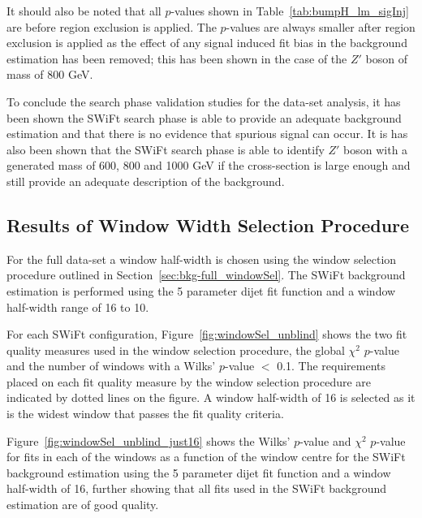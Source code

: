 It should also be noted that all \bh{} $p$-values shown in Table~\ref{tab:bumpH_lm_sigInj} are before region exclusion is applied.
The \bh{} \mbox{$p$-value}s are always smaller after region exclusion is applied
as the effect of any signal induced fit bias in the background estimation has been removed;
this has been shown in the case of the $Z'$ boson of mass of 800 GeV.

To conclude the search phase validation studies for the \lm{} data-set analysis,
it has been shown the SWiFt search phase is
able to provide an adequate background estimation 
and that there is no evidence that spurious signal can occur.
It is has also been shown that 
the SWiFt search phase is able to identify
$Z'$ boson with a generated mass of 600, 800 and 1000 GeV if the cross-section is large enough
and still provide an adequate description of the background.

\subsection{Results of Window Width Selection Procedure}
\label{sec:bkg-full_windowSelResults}

For the full \lm{} data-set a window half-width is chosen using the window selection procedure outlined in Section~\ref{sec:bkg-full_windowSel}.
The SWiFt background estimation is performed using the 5 parameter dijet fit function and a window half-width range of 16 to 10.

For each SWiFt configuration, Figure~\ref{fig:windowSel_unblind} shows the two fit quality measures used in the window selection procedure,
the global $\chi^2$ $p$-value and the number of windows with a Wilks' $p$-value $<$ 0.1.
The requirements placed on each fit quality measure by the window selection procedure are indicated by dotted lines on the figure.
A window half-width of 16 is selected as it is the widest window that passes the fit quality criteria.

\newpage
Figure~\ref{fig:windowSel_unblind_just16} shows the Wilks' $p$-value and $\chi^2$ $p$-value for fits in each of the windows
as a function of the window centre for the SWiFt background estimation using the 5 parameter dijet fit function and a window half-width of 16,
further showing that all fits used in the SWiFt background estimation are of good quality.

